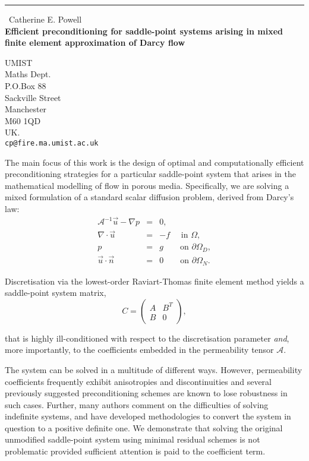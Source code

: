 \documentclass{report}
\begin{document}
\begin{center}
\rule{6in}{1pt} \
{\large Catherine E. Powell \\
{\bf Efficient preconditioning for saddle-point systems arising in mixed finite element approximation of Darcy flow}}

UMIST \\ Maths Dept. \\ P.O.Box 88 \\ Sackville Street \\ Manchester \\ M60 1QD \\ UK.
\\
{\tt cp@fire.ma.umist.ac.uk}\end{center}

The main focus of this work is the design of optimal and
computationally efficient preconditioning strategies for a particular
saddle-point system that arises in the mathematical modelling of flow in
porous media. Specifically, we are solving a mixed formulation of a
standard scalar diffusion problem, derived from Darcy's law:
\begin{equation}
\nonumber
\begin{array}{rcl}
\mathcal{A}^{-1}\vec {u}-\nabla p &= & 0,\\
\nabla \cdot \vec {u} &=& -f \quad \, \, \mbox{in } \Omega,\\
p &=& g
\quad\quad \mbox{on } \partial\Omega_{D},\\
\vec {u}\cdot\vec {n} &=& 0
\quad\quad \mbox{on } \partial\Omega_{N}.
\end{array}
\end{equation}

\noindent
Discretisation via the lowest-order Raviart-Thomas finite
element method yields a saddle-point system matrix,
$$ C = \left(\begin{array}{cc} A & B^{T} \\ B & 0
\end{array}\right),$$

\noindent that is highly ill-conditioned with respect to the
discretisation parameter \textit{and}, more importantly, to the
coefficients embedded in the permeability tensor $\mathcal{A}.$

The system can be solved in a multitude of different ways. However,
permeability coefficients frequently exhibit anisotropies and
discontinuities and several previously suggested preconditioning schemes
are known to lose robustness in such cases. Further, many authors comment
on the difficulties of solving indefinite systems, and have developed
methodologies to convert the system in question to a positive definite
one. We demonstrate that solving the original unmodified saddle-point
system using minimal residual schemes is not problematic provided
sufficient attention is paid to the coefficient term.
\end{document}
